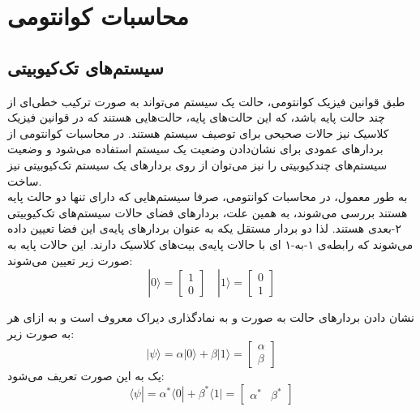 

\section{محاسبات کوانتومی}

\subsection{سیستم‌های تک‌کیوبیتی}

طبق قوانین فیزیک کوانتومی، حالت یک سیستم می‌تواند به صورت ترکیب خطی‌ای از چند حالت پایه باشد، که این حالت‌های پایه، حالت‌هایی هستند که در قوانین فیزیک کلاسیک نیز حالات صحیحی برای توصیف سیستم هستند.
در محاسبات کوانتومی از بردارهای عمودی برای نشان‌دادن وضعیت یک سیستم استفاده می‌شود و وضعیت سیستم‌های چندکیوبیتی را نیز می‌توان از روی بردارهای یک سیستم تک‌کیوبیتی نیز ساخت.
\\
به طور معمول، در محاسبات کوانتومی، صرفا سیستم‌هایی که دارای تنها دو حالت پایه هستند بررسی می‌شوند، به همین علت، بردارهای فضای حالات سیستم‌های تک‌کیوبیتی ۲-بعدی هستند. لذا دو بردار مستقل یکه به عنوان بردارهای پایه‌ی این فضا تعیین داده می‌شوند که رابطه‌ی ۱-به-۱ ای با حالات پایه‌ی بیت‌های کلاسیک دارند.
این حالات پایه به صورت زیر تعیین می‌شوند:
\begin{equation}
    |0\rangle = \begin{bmatrix} 1 \\ 0 \end{bmatrix} 
    \mspace{18mu}
    |1\rangle = \begin{bmatrix} 0 \\ 1 \end{bmatrix}
\end{equation} 

نشان دادن بردارهای حالت به صورت 
\lr{$|0\rangle$} و \lr{$|1\rangle$}
به نمادگذاری  دیراک
معروف است و به ازای هر
به صورت زیر:
\begin{equation}
    |\psi\rangle = \alpha |0\rangle + \beta |1\rangle
    = \begin{bmatrix}
    \alpha \\[3pt]
    \beta
    \end{bmatrix}
\end{equation}
یک 
به این صورت تعریف می‌شود:
\begin{equation}
    \langle \psi| = \alpha^* \langle0| + \beta^* \langle1| = \begin{bmatrix} \alpha^* & \beta^* \end{bmatrix} 
\end{equation}

